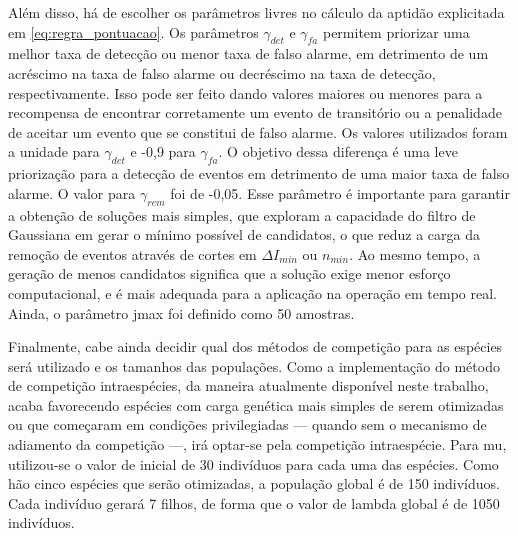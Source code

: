 Além disso, há de escolher os parâmetros livres no cálculo da aptidão
explicitada em \ref{eq:regra_pontuacao}. Os parâmetros $\gamma_{det}$
e $\gamma_{fa}$ permitem priorizar uma melhor taxa de detecção ou
menor taxa de falso alarme, em detrimento de um acréscimo na taxa de
falso alarme ou decréscimo na taxa de detecção, respectivamente. Isso
pode ser feito dando valores maiores ou menores para a recompensa de
encontrar corretamente um evento de transitório ou a penalidade de
aceitar um evento que se constitui de falso alarme.
Os valores utilizados foram a unidade para $\gamma_{det}$ e -0,9 para
$\gamma_{fa}$. O objetivo dessa diferença é uma leve priorização para
a detecção de eventos em detrimento de uma maior taxa de falso alarme.
O valor para $\gamma_{rem}$ foi de -0,05. Esse parâmetro é importante
para garantir a obtenção de soluções mais simples, que exploram a
capacidade do filtro de Gaussiana em gerar o mínimo possível de
candidatos, o que reduz a carga da remoção de eventos através de
cortes em $\Delta{I}_{min}$ ou $n_{min}$. Ao mesmo tempo, 
a geração de menos candidatos significa que a solução exige menor
esforço computacional, e é mais adequada para a aplicação na operação
em tempo real. Ainda, o parâmetro \acs{jmax} foi definido como 50
amostras. 

Finalmente, cabe ainda decidir qual dos métodos de competição para as
espécies será utilizado e os tamanhos das populações. Como a
implementação do método de competição intraespécies, da maneira
atualmente disponível neste trabalho, acaba favorecendo espécies com
carga genética mais simples de serem otimizadas ou que começaram em
condições privilegiadas --- quando sem o mecanismo de adiamento da
competição ---, irá optar-se pela competição intraespécie. Para
\acs{mu}, utilizou-se o valor de inicial de 30 indivíduos para cada
uma das espécies. Como hão cinco espécies que serão otimizadas, a
população global é de 150 indivíduos. Cada indivíduo gerará 7 filhos,
de forma que o valor de \acs{lambda} global é de 1050 indivíduos.





